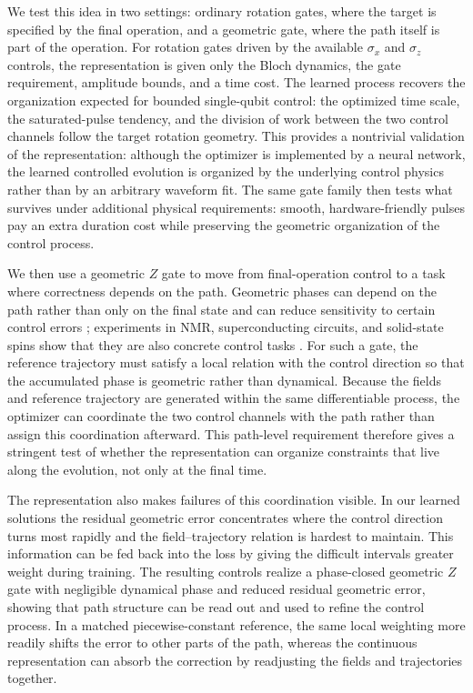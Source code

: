 \documentclass[aps,prx,reprint,superscriptaddress,nofootinbib,longbibliography,floatfix,showkeys]{revtex4-2}
\begin{document}
We test this idea in two settings: ordinary rotation gates, where the target
is specified by the final operation, and a geometric gate, where the path
itself is part of the operation.  For rotation gates driven by the available
$\sigma_x$ and $\sigma_z$ controls, the representation is given only the
Bloch dynamics, the gate requirement, amplitude bounds, and a time cost.
The learned process recovers the organization expected for bounded
single-qubit control: the optimized time scale, the saturated-pulse tendency,
and the division of work between the two control channels follow the target
rotation geometry.  This provides a nontrivial validation of the
representation: although the optimizer is implemented by a neural network,
the learned controlled evolution is organized by the underlying control
physics rather than by an arbitrary waveform fit.  The same gate family then
tests what survives under additional physical requirements: smooth,
hardware-friendly pulses pay an extra duration cost while preserving the
geometric organization of the control process.

We then use a geometric $Z$ gate to move from final-operation control to a
task where correctness depends on the path.  Geometric phases can depend on
the path rather than only on the final state and can reduce sensitivity to
certain control errors
\cite{Berry1984GeometricPhase,Aharonov1987CyclicPhase,Wilczek1984GaugeStructure,Zanardi1999HolonomicQC,Zhu2002NonadiabaticGeometric,Sjoqvist2012NonadiabaticHolonomic,Zhang2023GeometricHolonomicReview};
experiments in NMR, superconducting circuits, and solid-state spins show that
they are also concrete control tasks
\cite{Jones2000GeometricNMR,Feng2013NHQCExperiment,Abdumalikov2013NonAbelian,Nagata2018HolonomicSpin}.
For such a gate, the reference trajectory must satisfy a local relation with
the control direction so that the accumulated phase is geometric rather than
dynamical.  Because the fields and reference trajectory are generated within
the same differentiable process, the optimizer can coordinate the two control
channels with the path rather than assign this coordination afterward.  This
path-level requirement therefore gives a stringent test of whether the
representation can organize constraints that live along the evolution, not
only at the final time.

The representation also makes failures of this coordination visible.  In our
learned solutions the residual geometric error concentrates where the control
direction turns most rapidly and the field--trajectory relation is hardest to
maintain.  This information can be fed back into the loss by giving the
difficult intervals greater weight during training.  The resulting controls
realize a phase-closed geometric $Z$ gate with negligible dynamical phase and
reduced residual geometric error, showing that path structure can be read out
and used to refine the control process.  In a matched piecewise-constant
reference, the same local weighting more readily shifts the error to other
parts of the path, whereas the continuous representation can absorb the
correction by readjusting the fields and trajectories together.
\end{document}
